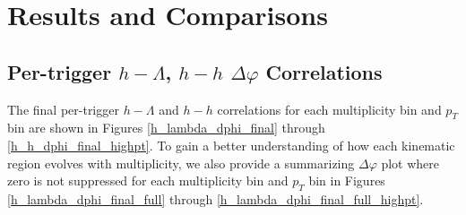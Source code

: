 \documentclass[ALICE,manyauthors]{ALICE_analysis_notes}
\begin{document}
\clearpage




\section{Results and Comparisons}
\label{results}
\subsection{Per-trigger $h-\Lambda$, $h-h$ $\Delta\varphi$ Correlations}
The final per-trigger $h-\Lambda$ and $h-h$ correlations for each multiplicity bin and $p_{T}$ bin are shown in Figures \ref{h_lambda_dphi_final} through \ref{h_h_dphi_final_highpt}. To gain a better understanding of how each kinematic region evolves with multiplicity, we also provide a summarizing $\Delta\varphi$ plot where zero is not suppressed for each multiplicity bin and $p_{T}$ bin in Figures \ref{h_lambda_dphi_final_full} through \ref{h_lambda_dphi_final_full_highpt}.

\clearpage
\end{document}
